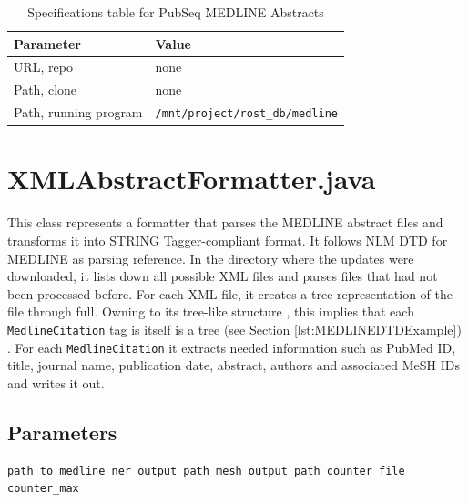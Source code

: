 \begin{table}[htbp]
\caption{Specifications table for PubSeq MEDLINE Abstracts}
\centering
\begin{tabular}{ | l | l | }
  \hline
  Parameter & Value \\
  \hline
  URL, repo & none \\
  Path, clone & none \\
  Path, running program & \texttt{/mnt/project/rost\_db/medline}\\
  \hline
\end{tabular}
\end{table}



\section{XMLAbstractFormatter.java}

\label{sec:XMLAbstractFormatter}

This class represents a formatter that parses the MEDLINE abstract files and transforms it into STRING Tagger-compliant format. It follows NLM DTD for MEDLINE \citep{MEDLINEDTD} as parsing reference. In the directory where the updates were downloaded, it lists down all possible XML files and parses files that had not been processed before. For each XML file, it creates a tree representation of the file through full. Owning to its tree-like structure \citep{bray2011extensible} \citep{MEDLINEDTD}, this implies that each \texttt{MedlineCitation} tag is itself is a tree (see Section \ref{lst:MEDLINEDTDExample}) . For each \texttt{MedlineCitation} it extracts needed information such as PubMed ID, title, journal name, publication date, abstract, authors and associated MeSH IDs \citep{lowe1994understanding} and writes it out.

\subsection{Parameters}

\begin{lstlisting}[breaklines]
path_to_medline ner_output_path mesh_output_path counter_file counter_max
\end{lstlisting}

